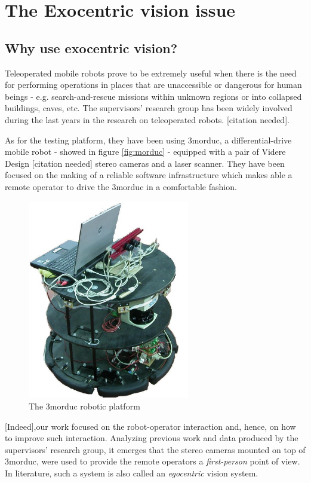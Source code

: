 \section{The Exocentric vision issue}
\label{sec:exo}
\subsection{Why use exocentric vision?}
Teleoperated mobile robots prove to be extremely useful 
when there is the need for performing operations in places that 
are unaccessible or dangerous for human beings - e.g. 
search-and-rescue missions within unknown regions or into 
collapsed buildings, caves, etc.
%
The supervisors' research group has been widely involved 
during the last years in the research on teleoperated robots. 
[citation needed].

As for the testing platform, they have been using 3morduc,
a differential-drive mobile robot - showed in figure \ref{fig:morduc} -
equipped with a pair of Videre Design [citation needed] 
stereo cameras and a laser scanner.
They have been focused on the making of a reliable software 
infrastructure which makes able a remote operator to drive 
the 3morduc in a comfortable fashion.
%
\begin{figure}[!h]
  \begin{center}
    \includegraphics[width=200pt]{img/3morduc}  %
    \caption{The 3morduc robotic platform}
    \label{fig:3morduc}
  \end{center}
\end{figure}
%
[Indeed],our work focused on the robot-operator interaction and, 
hence, on how to improve such interaction. Analyzing previous work 
and data produced by the supervisors' research group, it emerges 
that the stereo cameras mounted on top of 3morduc, were used to 
provide the remote operators a \textit{first-person} point of view. 
In literature, such a system is also called an \textit{egocentric} 
vision system.
%

